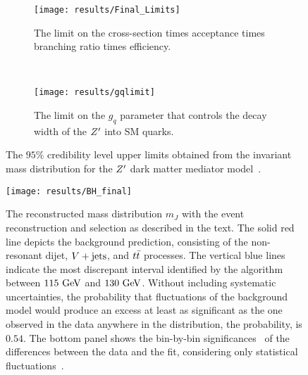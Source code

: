 \begin{figure}[htbp]
 \centering
 \begin{subfigure}[t]{0.5\textwidth}
  \centering
  \texttt{[image: results/Final\_Limits]}
  \caption{The limit on the cross-section times acceptance times branching ratio times efficiency.}
  \label{fig:cross_section_limits}
 \end{subfigure}%
 ~
 \begin{subfigure}[t]{0.5\textwidth}
  \centering
  \texttt{[image: results/gqlimit]}
  \caption{The limit on the $g_{q}$ parameter that controls the decay width of the $\Zprime$ into SM quarks.}
  \label{fig:gq_limits}
 \end{subfigure}
 \caption[The $95\%$ credibility level upper limits obtained from the invariant mass distribution for the $\Zprime$ dark matter mediator model.]{%
  The $95\%$ credibility level upper limits obtained from the invariant mass distribution for the $\Zprime$ dark matter mediator model~\cite{ATLAS-CONF-2018-052}.}
 \label{fig:Zprime_limits}
\end{figure}

\begin{figure}[htbp]
 \centering
 \texttt{[image: results/BH\_final]}
 \caption[\BumpHunter{} fit of post-fit background-only model to data.]{%
  The reconstructed mass distribution $m_{J}$ with the event reconstruction and selection as described in the text.
  The solid red line depicts the background prediction, consisting of the non-resonant dijet, $V + \text{jets}$, and $t\bar{t}$ processes.
  The vertical blue lines indicate the most discrepant interval identified by the \BumpHunter{} algorithm between $115~\mathrm{GeV}$ and $130~\mathrm{GeV}$.
  Without including systematic uncertainties, the probability that fluctuations of the background model would produce an excess at least as significant as the one observed in the data anywhere in the distribution, the \BumpHunter{} probability, is $0.54$.
  The bottom panel shows the bin-by-bin significances~\cite{Choudalakis:2012} of the differences between the data and the fit, considering only statistical fluctuations~\cite{ATLAS-CONF-2018-052}.
 }
 \label{fig:BumpHunter_scan}
\end{figure}

